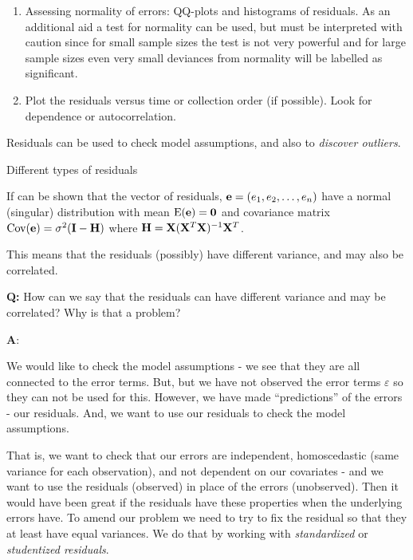 \documentclass[ignorenonframetext,]{beamer}
\providecommand{\tightlist}{%
  \setlength{\itemsep}{0pt}\setlength{\parskip}{0pt}}
\begin{document}
\begin{frame}

\begin{enumerate}
\def\labelenumi{\arabic{enumi}.}
\setcounter{enumi}{2}
\tightlist
\item
  Assessing normality of errors: QQ-plots and histograms of residuals.
  As an additional aid a test for normality can be used, but must be
  interpreted with caution since for small sample sizes the test is not
  very powerful and for large sample sizes even very small deviances
  from normality will be labelled as significant.
\item
  Plot the residuals versus time or collection order (if possible). Look
  for dependence or autocorrelation.
\end{enumerate}

Residuals can be used to check model assumptions, and also to
\emph{discover outliers}.

\end{frame}

\begin{frame}

\begin{block}{Different types of residuals}

If can be shown that the vector of residuals,
\({\bf e}=(e_1,e_2,\ldots,e_n)\) have a normal (singular) distribution
with mean \(\text{E}({\bf e})={\bf 0}\) and covariance matrix
\(\text{Cov}({\bf e})=\sigma^2({\bf I}-{\bf H})\) where
\({\bf H}={\bf X}({\bf X}^T{\bf X})^{-1}{\bf X}^T\).

This means that the residuals (possibly) have different variance, and
may also be correlated.

\textbf{Q:} How can we say that the residuals can have different
variance and may be correlated? Why is that a problem?

\end{block}

\end{frame}

\begin{frame}

\textbf{A}:

We would like to check the model assumptions - we see that they are all
connected to the error terms. But, but we have not observed the error
terms \(\varepsilon\) so they can not be used for this. However, we have
made ``predictions'' of the errors - our residuals. And, we want to use
our residuals to check the model assumptions.

That is, we want to check that our errors are independent, homoscedastic
(same variance for each observation), and not dependent on our
covariates - and we want to use the residuals (observed) in place of the
errors (unobserved). Then it would have been great if the residuals have
these properties when the underlying errors have. To amend our problem
we need to try to fix the residual so that they at least have equal
variances. We do that by working with \emph{standardized} or
\emph{studentized residuals}.

\end{frame}
\end{document}
